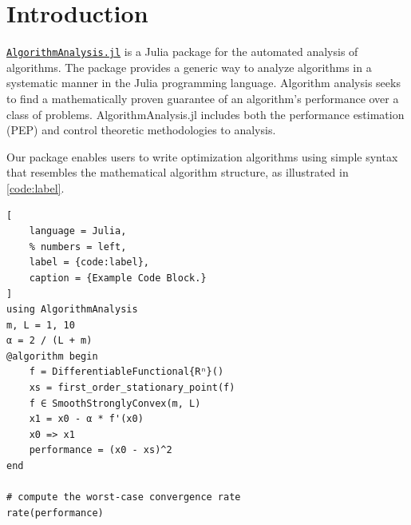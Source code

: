 \documentclass{juliacon}
\begin{document}


\maketitle

\begin{abstract}

\href{https://github.com/vanscoy/AlgorithmAnalysis.jl/stable/}{\texttt{AlgorithmAnalysis.jl}} is a Julia package for the automated analysis of algorithms. The package provides a generic way to analyze algorithms in a systematic manner in the Julia programming language. Algorithm analysis seeks to find a mathematically proven guarantee of an algorithm's performance over a class of problems. AlgorithmAnalysis.jl includes both the performance estimation (PEP) and control theoretic methodologies to analysis.

\end{abstract}

\section{Introduction}


\href{https://github.com/vanscoy/AlgorithmAnalysis.jl/stable/}{\texttt{AlgorithmAnalysis.jl}} is a Julia package for the automated analysis of algorithms. The package provides a generic way to analyze algorithms in a systematic manner in the Julia programming language. Algorithm analysis seeks to find a mathematically proven guarantee of an algorithm's performance over a class of problems. AlgorithmAnalysis.jl includes both the performance estimation (PEP) and control theoretic methodologies to analysis.

Our package enables users to write optimization algorithms using simple syntax that resembles the mathematical algorithm structure, as illustrated in \cref{code:label}.

\begin{lstlisting}[
    language = Julia,
    % numbers = left,
    label = {code:label}, 
    caption = {Example Code Block.}
]
using AlgorithmAnalysis
m, L = 1, 10
α = 2 / (L + m)
@algorithm begin
    f = DifferentiableFunctional{Rⁿ}()
    xs = first_order_stationary_point(f)
    f ∈ SmoothStronglyConvex(m, L)
    x1 = x0 - α * f'(x0)
    x0 => x1
    performance = (x0 - xs)^2
end

# compute the worst-case convergence rate
rate(performance)
\end{lstlisting}
\end{document}
